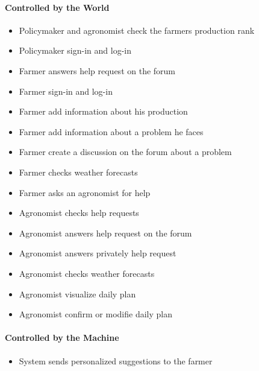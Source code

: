 \paragraph{Controlled by the World}
\begin{itemize}
    \item Policymaker and agronomist check the farmers production rank
    \item Policymaker sign-in and log-in
    \item Farmer answers help request on the forum
    \item Farmer sign-in and log-in 
    \item Farmer add information about his production
    \item Farmer add information about a problem he faces
    \item Farmer create a discussion on the forum about a problem
    \item Farmer checks weather forecasts
    \item Farmer asks an agronomist for help
    \item Agronomist checks help requests
    \item Agronomist answers help request on the forum
    \item Agronomist answers privately help request
    \item Agronomist checks weather forecasts
    \item Agronomist visualize daily plan
    \item Agronomist confirm or modifie daily plan
\end{itemize}

\paragraph{Controlled by the Machine}
\begin{itemize}
    \item System sends personalized suggestions to the farmer
\end{itemize}


